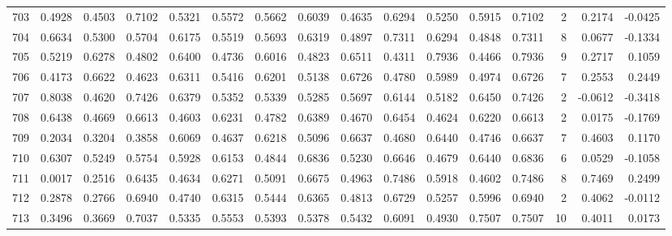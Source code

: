 \begin{tabular}{lrrrrrrrrrrrrrrr}
703 &      0.4928 &  0.4503 &  0.7102 &  0.5321 &  0.5572 &  0.5662 &  0.6039 &  0.4635 &  0.6294 &  0.5250 &   0.5915 &     0.7102 &      2 &                    0.2174 &                    -0.0425 \\
704 &      0.6634 &  0.5300 &  0.5704 &  0.6175 &  0.5519 &  0.5693 &  0.6319 &  0.4897 &  0.7311 &  0.6294 &   0.4848 &     0.7311 &      8 &                    0.0677 &                    -0.1334 \\
705 &      0.5219 &  0.6278 &  0.4802 &  0.6400 &  0.4736 &  0.6016 &  0.4823 &  0.6511 &  0.4311 &  0.7936 &   0.4466 &     0.7936 &      9 &                    0.2717 &                     0.1059 \\
706 &      0.4173 &  0.6622 &  0.4623 &  0.6311 &  0.5416 &  0.6201 &  0.5138 &  0.6726 &  0.4780 &  0.5989 &   0.4974 &     0.6726 &      7 &                    0.2553 &                     0.2449 \\
707 &      0.8038 &  0.4620 &  0.7426 &  0.6379 &  0.5352 &  0.5339 &  0.5285 &  0.5697 &  0.6144 &  0.5182 &   0.6450 &     0.7426 &      2 &                   -0.0612 &                    -0.3418 \\
708 &      0.6438 &  0.4669 &  0.6613 &  0.4603 &  0.6231 &  0.4782 &  0.6389 &  0.4670 &  0.6454 &  0.4624 &   0.6220 &     0.6613 &      2 &                    0.0175 &                    -0.1769 \\
709 &      0.2034 &  0.3204 &  0.3858 &  0.6069 &  0.4637 &  0.6218 &  0.5096 &  0.6637 &  0.4680 &  0.6440 &   0.4746 &     0.6637 &      7 &                    0.4603 &                     0.1170 \\
710 &      0.6307 &  0.5249 &  0.5754 &  0.5928 &  0.6153 &  0.4844 &  0.6836 &  0.5230 &  0.6646 &  0.4679 &   0.6440 &     0.6836 &      6 &                    0.0529 &                    -0.1058 \\
711 &      0.0017 &  0.2516 &  0.6435 &  0.4634 &  0.6271 &  0.5091 &  0.6675 &  0.4963 &  0.7486 &  0.5918 &   0.4602 &     0.7486 &      8 &                    0.7469 &                     0.2499 \\
712 &      0.2878 &  0.2766 &  0.6940 &  0.4740 &  0.6315 &  0.5444 &  0.6365 &  0.4813 &  0.6729 &  0.5257 &   0.5996 &     0.6940 &      2 &                    0.4062 &                    -0.0112 \\
713 &      0.3496 &  0.3669 &  0.7037 &  0.5335 &  0.5553 &  0.5393 &  0.5378 &  0.5432 &  0.6091 &  0.4930 &   0.7507 &     0.7507 &     10 &                    0.4011 &                     0.0173 \\

\end{tabular}
